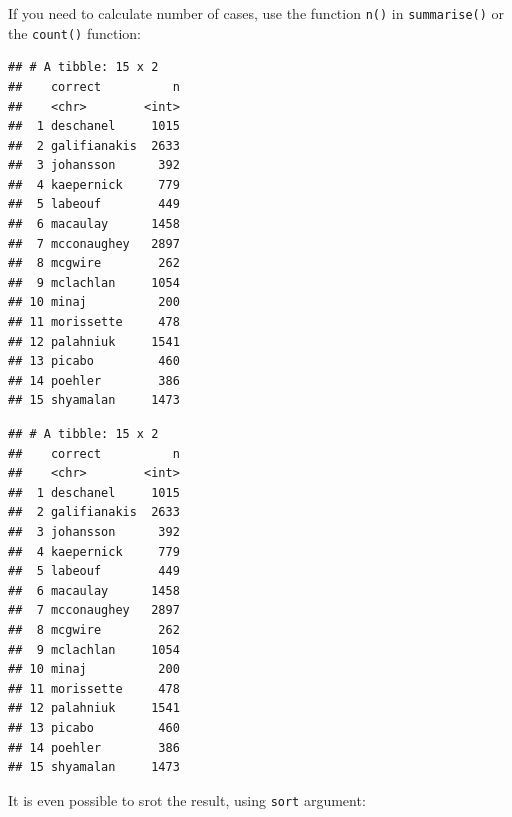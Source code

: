 \documentclass[
]{book}
\newenvironment{Shaded}{\begin{snugshade}}{\end{snugshade}}
\newcommand{\DataTypeTok}[1]{\textcolor[rgb]{0.13,0.29,0.53}{#1}}
\newcommand{\KeywordTok}[1]{\textcolor[rgb]{0.13,0.29,0.53}{\textbf{#1}}}
\newcommand{\NormalTok}[1]{#1}
\newcommand{\OperatorTok}[1]{\textcolor[rgb]{0.81,0.36,0.00}{\textbf{#1}}}
\newcommand{\OtherTok}[1]{\textcolor[rgb]{0.56,0.35,0.01}{#1}}
\newcommand{\StringTok}[1]{\textcolor[rgb]{0.31,0.60,0.02}{#1}}
\begin{document}
If you need to calculate number of cases, use the function \texttt{n()} in \texttt{summarise()} or the \texttt{count()} function:

\begin{Shaded}
\end{Shaded}

\begin{verbatim}
## # A tibble: 15 x 2
##    correct          n
##    <chr>        <int>
##  1 deschanel     1015
##  2 galifianakis  2633
##  3 johansson      392
##  4 kaepernick     779
##  5 labeouf        449
##  6 macaulay      1458
##  7 mcconaughey   2897
##  8 mcgwire        262
##  9 mclachlan     1054
## 10 minaj          200
## 11 morissette     478
## 12 palahniuk     1541
## 13 picabo         460
## 14 poehler        386
## 15 shyamalan     1473
\end{verbatim}

\begin{Shaded}
\end{Shaded}

\begin{verbatim}
## # A tibble: 15 x 2
##    correct          n
##    <chr>        <int>
##  1 deschanel     1015
##  2 galifianakis  2633
##  3 johansson      392
##  4 kaepernick     779
##  5 labeouf        449
##  6 macaulay      1458
##  7 mcconaughey   2897
##  8 mcgwire        262
##  9 mclachlan     1054
## 10 minaj          200
## 11 morissette     478
## 12 palahniuk     1541
## 13 picabo         460
## 14 poehler        386
## 15 shyamalan     1473
\end{verbatim}

It is even possible to srot the result, using \texttt{sort} argument:

\begin{Shaded}
\end{Shaded}
\end{document}
